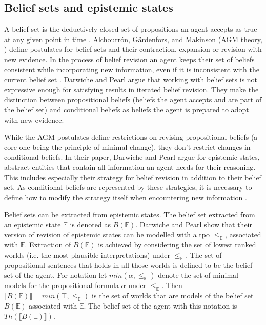 \documentclass[english, 12pt]{scrartcl}
\theoremstyle{definition}
\theoremstyle{definition}
\theoremstyle{definition}
\newcommand{\modelsOf}[1]{\llbracket #1 \rrbracket}
\begin{document}
\subsection{Belief sets and epistemic states}
\label{chapter:belief-sets-and-epistemic-states}


A belief set is the deductively closed set of propositions an agent accepts as true at any given point in time \cite{Ferme2011}. Alchourrón, Gärdenfors, and Makinson (AGM theory, \cite{Alchourron1985}) define postulates for belief sets and their contraction, expansion or revision with new evidence. In the process of belief revision an agent keeps their set of beliefs consistent while incorporating new information, even if it is inconsistent with the current belief set \cite{Gaerdenfors1984}. Darwiche and Pearl \cite{Darwiche1997} argue that working with belief sets is not expressive enough for satisfying results in iterated belief revision. They make the distinction between propositional beliefs (beliefs the agent accepts and are part of the belief set) and conditional beliefs as beliefs the agent is prepared to adopt with new evidence.

While the AGM postulates define restrictions on revising propositional beliefs (a core one being the principle of minimal change), they don't restrict changes in conditional beliefs. In their paper, Darwiche and Pearl argue for epistemic states, abstract entities that contain all information an agent needs for their reasoning. This includes especially their strategy for belief revision in addition to their belief set. As conditional beliefs are represented by these strategies, it is necessary to define how to modify the strategy itself when encountering new information \cite{Darwiche1997}.

Belief sets can be extracted from epistemic states. The belief set extracted from an epistemic state $\mathbb{E}$ is denoted as $B(\mathbb{E})$. Darwiche and Pearl show that their version of revision of epistemic states can be modelled with a tpo $\leq_{\mathbb{E}}$, associated with $\mathbb{E}$. Extraction of $B(\mathbb{E})$ is achieved by considering the set of lowest ranked worlds (i.e. the most plausible interpretations) under $\leq_{\mathbb{E}}$. The set of propositional sentences that holds in all those worlds is defined to be the belief set of the agent. For notation let $min(\alpha, \leq_{\mathbb{E}})$ denote the set of minimal models for the propositional formula $\alpha$ under $\leq_{\mathbb{E}}$. Then $\modelsOf{B(\mathbb{E})} = min(\top, \leq_{\mathbb{E}})$ is the set of worlds that are models of the belief set $B(\mathbb{E})$ associated with $\mathbb{E}$. The belief set of the agent with this notation is $Th(\modelsOf{B(\mathbb{E})})$.
\end{document}
